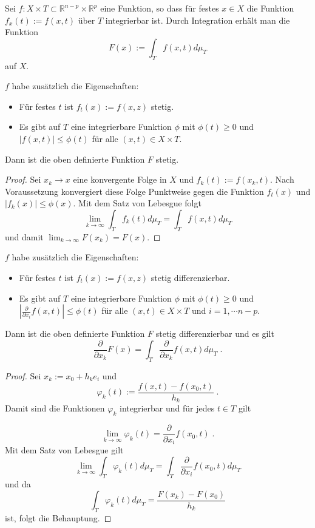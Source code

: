 Sei $f: X \times T \subset \mathbb{R}^{n-p} \times \mathbb{R}^p$ eine Funktion, so dass für festes $x \in X$ die Funktion $f_x(t) := f(x,t)$ über $T$ integrierbar ist. Durch Integration erhält man die Funktion 
$$ F(x) := \int_T f(x,t)  d \mu_T$$ 
auf $X$.

\begin{Satz}[Stetigkeitssatz]
$f$ habe zusätzlich die Eigenschaften:
\begin{itemize}
\item Für festes $t$ ist $f_t(x):= f(x,z)$ stetig.
\item Es gibt auf $T$ eine integrierbare Funktion $\phi$ mit $\phi(t) \geq 0$ und $|f(x,t)| \leq \phi(t)$ für alle $(x,t) \in X \times T$.
\end{itemize}
Dann ist die oben definierte Funktion $F$ stetig. 
\end{Satz}
\begin{proof}
Sei  $x_k \to x$   eine konvergente Folge in $X$ und $f_k(t):= f(x_k,t)$. Nach Voraussetzung konvergiert diese Folge Punktweise gegen die Funktion $f_t(x)$ und $| f_k (x) | \leq \phi(x)$. Mit dem Satz von Lebesgue folgt
$$ \lim_{k \to \infty} \int_T f_k(t) d \mu_T = \int_T f(x,t) d \mu_T$$
und damit $ \lim_{k \to \infty} F(x_k) =  F(x)$.
\end{proof}

\begin{Satz}[Differentiationssatz]
$f$ habe zusätzlich die Eigenschaften:
\begin{itemize}
\item Für festes $t$ ist $f_t(x):= f(x,z)$ stetig differenzierbar.
\item Es gibt auf $T$ eine integrierbare Funktion $\phi$ mit $\phi(t) \geq 0$ und $| \frac{\partial}{\partial x_i} f(x,t)| \leq \phi(t)$ für alle $(x,t) \in X \times T$ und $i=1, \cdots n-p$.
\end{itemize}
Dann ist die oben definierte Funktion $F$ stetig differenzierbar und es gilt
$$\frac{\partial}{\partial x_k} F(x)  = \int_T \frac{\partial}{\partial x_k} f(x,t) d \mu_T \; .$$ 
\end{Satz}
\begin{proof}
Sei $x_k := x_0 + h_k e_i$ und 
$$ \varphi_k (t) := \frac{f(x,t)  - f(x_0,t)  }{h_k} \; .$$
Damit sind die Funktionen  $\varphi_k $ integrierbar und für jedes $t \in T$ gilt

$$  \lim_{k \to \infty} \varphi_k (t) = \frac{\partial}{\partial x_i}f(x_0, t) \; .$$
Mit dem Satz von Lebesgue gilt
$$ \lim_{k \to \infty}  \int_T \varphi_k (t) d \mu_T = \int_T   \frac{\partial}{\partial x_i}f(x_0, t) d \mu_T $$
und da 
$$  \int_T \varphi_k (t) d \mu_T = \frac{F(x_k) -F(x_0)}{h_k}$$ ist, folgt die Behauptung.
 
\end{proof}




